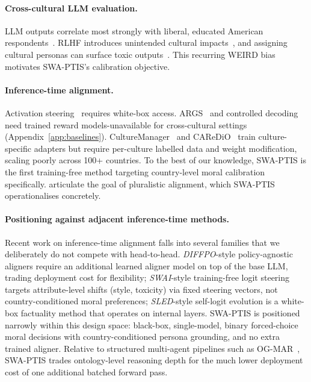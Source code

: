 \documentclass{article}
\begin{document}
\paragraph{Cross-cultural LLM evaluation.}
LLM outputs correlate most strongly with liberal, educated American
respondents~\citep{santurkar2023opinions}. RLHF introduces unintended cultural
impacts~\citep{ryan2024unintended}, and assigning cultural personas can surface
toxic outputs~\citep{deshpande2023toxicity}. This recurring WEIRD bias motivates
SWA-PTIS's calibration objective.

\paragraph{Inference-time alignment.}
Activation steering~\citep{arditi2025refusal, zou2023representation} requires
white-box access. ARGS~\citep{khanov2024args} and controlled
decoding~\citep{mudgal2024controlled} need trained reward models-unavailable for
cross-cultural settings (Appendix~\ref{app:baselines}).
CultureManager~\citep{li2024culturemanager} and CAReDiO~\citep{yao2024caredio}
train culture-specific adapters but require per-culture labelled data and weight
modification, scaling poorly across 100+ countries. To the best of our knowledge,
SWA-PTIS is the first training-free method targeting country-level moral
calibration specifically.
\citet{sorensen2024roadmap} articulate the goal of pluralistic alignment, which
SWA-PTIS operationalises concretely.

\paragraph{Positioning against adjacent inference-time methods.}
Recent work on inference-time alignment falls into several families that we
deliberately do not compete with head-to-head. \emph{DIFFPO}-style
policy-agnostic aligners require an additional learned aligner model on top
of the base LLM, trading deployment cost for flexibility; \emph{SWAI}-style
training-free logit steering targets attribute-level shifts (style,
toxicity) via fixed steering vectors, not country-conditioned moral
preferences; \emph{SLED}-style self-logit evolution is a white-box
factuality method that operates on internal layers. SWA-PTIS is positioned
narrowly within this design space: black-box, single-model, binary
forced-choice moral decisions with country-conditioned persona grounding,
and no extra trained aligner. Relative to structured multi-agent pipelines
such as OG-MAR~\citep{ogmar2024}, SWA-PTIS trades ontology-level reasoning
depth for the much lower deployment cost of one additional batched forward
pass.
\end{document}
